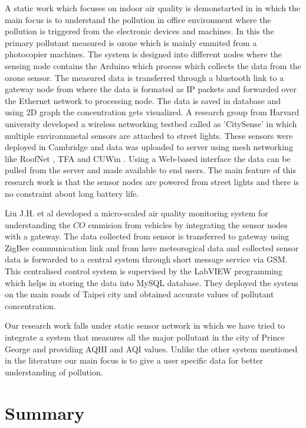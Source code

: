 A static work which focuses on indoor air quality is demonstarted in \cite{Firdhous2017} in which the main focus is to understand the pollution in office environment where the pollution is triggered from the electronic devices and machines. In this the primary pollutant measured is ozone which is mainly emmited from a photocopier machines. The system is designed into different nodes where the sensing node contains the Arduino which process which collects the data from the ozone sensor. The measured data is transferred through a bluetooth link to a gateway node from where the data is formated as IP packets and forwarded over the Ethernet network to processing node. The data is saved in database and using 2D graph the concentration gets visualized. A research group from Harvard university developed a wireless networking testbed called as 'CitySense' \cite{Murty2008} in which multiple environmnetal sensors are attached to street lights. These sensors were deployed in Cambridge and data was uploaded to server using mesh networking like RoofNet \cite{Bicket2005}, TFA \cite{Camp2006} and CUWin \cite{cuwin2006}. Using a Web-based interface the data can be pulled from the server and made available to end users. The main feature of this research work is that the sensor nodes are powered from street lights and there is no constraint about long battery life.
\par
Liu J.H. et al \cite{Liu2011} developed a micro-scaled air quality monitoring system for understanding the $CO$ emmision from vehicles by integrating the sensor nodes with a gateway. The data collected from sensor is transferred to gateway using ZigBee communication link and from here meteorogical data and collected sensor data is forwarded to a central system through short message service via GSM. This centralised control system is supervised by the LabVIEW \cite{INSTRUMENTS2013} programming which helps in storing the data into MySQL database. They deployed the system on the main roads of Taipei city and obtained accurate values of pollutant concentration.

Our research work falls under static sensor network in which we have tried to integrate a system that measures all the major pollutant in the city of Prince George and providing AQHI and AQI values. Unlike the other system mentioned in the literature our main focus is to give a user specific data for better understanding of pollution.

 \section{Summary}

